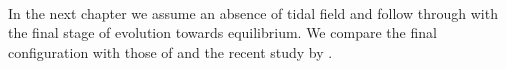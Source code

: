 \paragraph*{}
In the next chapter we assume an absence of tidal field and follow through with the final stage of evolution towards equilibrium. We compare the final configuration with those of \cite{Allison2009} and the recent study by \cite{Caputo2014}. 